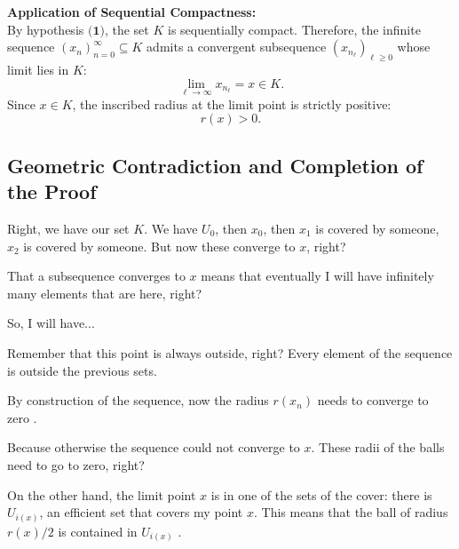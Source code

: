 \begin{proofWrapper}
\begin{content}
\textbf{Application of Sequential Compactness:} \\
By hypothesis $\textbf{(1)}$, the set $K$ is sequentially compact. Therefore, the infinite sequence $(x_n)_{n=0}^\infty \subseteq K$ admits a convergent subsequence $(x_{n_\ell})_{\ell \ge 0}$ whose limit lies in $K$:
\begin{equation}\label{eq:subsequence-limit}
\lim_{\ell \to \infty} x_{n_\ell} = x \in K.
\end{equation}
Since $x \in K$, the inscribed radius at the limit point is strictly positive:
\begin{equation}\label{eq:limit-radius-positive}
r(x) > 0.
\end{equation}
\end{content}

\subsection{Geometric Contradiction and Completion of the Proof}

\begin{speech}[01:21:33 - 01:23:04]
Right, we have our set $K$. We have $U_0$, then $x_0$, then $x_1$ is covered by someone, $x_2$ is covered by someone. But now these converge to $x$, right?

That a subsequence converges to $x$ means that eventually I will have infinitely many elements that are here, right?

So, I will have...
\end{speech}

\begin{speech}[01:23:04 - 01:24:25]
Remember that this point is always outside, right? Every element of the sequence is outside the previous sets.

By construction of the sequence, now the radius $r(x_n)$ needs to converge to zero .

Because otherwise the sequence could not converge to $x$. These radii of the balls need to go to zero, right?
\end{speech}

\begin{speech}[01:24:25 - 01:26:37]
On the other hand, the limit point $x$ is in one of the sets of the cover: there is $U_{i(x)}$, an efficient set that covers my point $x$. This means that the ball of radius $r(x) / 2$  is contained in $U_{i(x)}$ .


\end{speech}
\end{proofWrapper}
